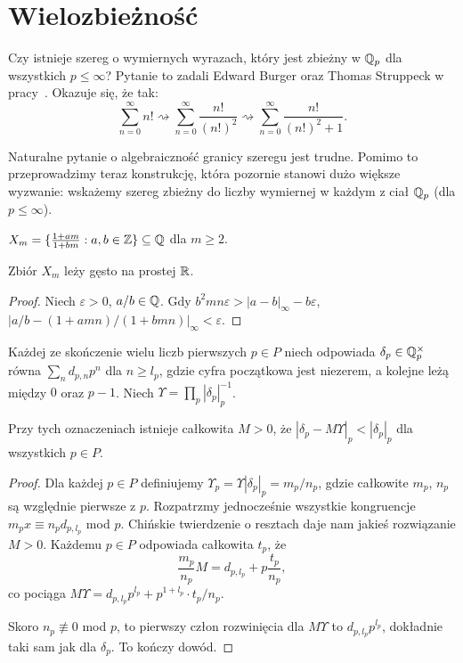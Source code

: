 \section{Wielozbieżność \label{burger}}
Czy istnieje szereg o wymiernych wyrazach, który jest zbieżny w $\mathbb Q_p$ dla wszystkich $p \le \infty$?
Pytanie to zadali Edward Burger oraz Thomas Struppeck w pracy~\cite{burger96}.
Okazuje się, że tak:
\[
	\sum_{n=0}^\infty n! \rightsquigarrow \sum_{n=0}^\infty \frac{n!}{(n!)^2} \rightsquigarrow \sum_{n=0}^\infty \frac{n!}{(n!)^2+1}.
\]

Naturalne pytanie o algebraiczność granicy szeregu jest trudne.
Pomimo to przeprowadzimy teraz konstrukcję, która pozornie stanowi dużo większe wyzwanie: wskażemy szereg zbieżny do liczby wymiernej w każdym z ciał $\mathbb Q_p$ (dla $p \le \infty$).

\begin{definicja}
	$X_m = \{\frac{1+am}{1 + bm} : a, b \in \mathbb Z\} \subseteq \mathbb Q$ dla $m \ge 2$.
\end{definicja}

\begin{lemat}[III]
	Zbiór $X_m$ leży gęsto na prostej $\mathbb R$.
\end{lemat}

\begin{proof}
	Niech $\varepsilon > 0$, $a/b \in \mathbb Q$.
	Gdy $b^2mn \varepsilon > |a-b|_\infty - b\varepsilon$,
	$|a/b - (1+amn)/(1+bmn)|_\infty < \varepsilon$.
\end{proof}

Każdej ze skończenie wielu liczb pierwszych $p \in P$ niech odpowiada $\delta_p \in \mathbb Q_p^\times$ równa $\sum_n d_{p, n} p^n$ dla $n \ge l_p$, gdzie cyfra początkowa jest niezerem, a kolejne leżą między $0$ oraz $p-1$.
Niech $\Upsilon = \prod_p |\delta_p|_p^{-1}$.

\begin{lemat}[IV]
	Przy tych oznaczeniach istnieje całkowita $M > 0$, że $|\delta_p - M \Upsilon|_p < |\delta_p|_p$ dla wszystkich $p \in P$.
\end{lemat}

\begin{proof}
	Dla każdej $p \in P$ definiujemy $\Upsilon_p = \Upsilon |\delta_p|_p = m_p / n_p$, gdzie całkowite $m_p$, $n_p$ są względnie pierwsze z $p$.
	Rozpatrzmy jednocześnie wszystkie kongruencje $m_p x \equiv n_p d_{p, l_p}$ mod $p$.
	Chińskie twierdzenie o resztach daje nam jakieś rozwiązanie $M > 0$.
	Każdemu $p \in P$ odpowiada całkowita $t_p$, że
	\[
		\frac{m_p}{n_p} M = d_{p, l_p} + p \frac{t_p}{n_p},
	\]
	co pociąga $M \Upsilon = d_{p, l_p} p^{l_p} + p^{1+l_p} \cdot {t_p} / {n_p}$. 

	Skoro $n_p \not\equiv 0$ mod $p$, to pierwszy człon rozwinięcia dla $M \Upsilon$ to $d_{p, l_p}p^{l_p}$, dokładnie taki sam jak dla $\delta_p$. 
	To kończy dowód.
\end{proof}

